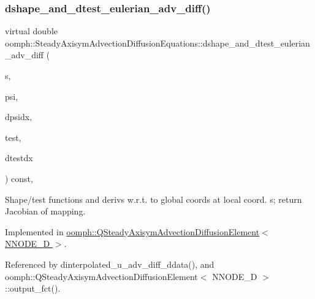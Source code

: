 \subsubsection{\texorpdfstring{dshape\+\_\+and\+\_\+dtest\+\_\+eulerian\+\_\+adv\+\_\+diff()}{dshape\_and\_dtest\_eulerian\_adv\_diff()}}
{\footnotesize\ttfamily virtual double oomph\+::\+Steady\+Axisym\+Advection\+Diffusion\+Equations\+::dshape\+\_\+and\+\_\+dtest\+\_\+eulerian\+\_\+adv\+\_\+diff (\begin{DoxyParamCaption}\item[{const \hyperlink{classoomph_1_1Vector}{Vector}$<$ double $>$ \&}]{s,  }\item[{\hyperlink{classoomph_1_1Shape}{Shape} \&}]{psi,  }\item[{\hyperlink{classoomph_1_1DShape}{D\+Shape} \&}]{dpsidx,  }\item[{\hyperlink{classoomph_1_1Shape}{Shape} \&}]{test,  }\item[{\hyperlink{classoomph_1_1DShape}{D\+Shape} \&}]{dtestdx }\end{DoxyParamCaption}) const\hspace{0.3cm}{\ttfamily [protected]}, {}}



Shape/test functions and derivs w.\+r.\+t. to global coords at local coord. s; return Jacobian of mapping. 



Implemented in \hyperlink{classoomph_1_1QSteadyAxisymAdvectionDiffusionElement_a489c77885741e624d87abe60a82483f3}{oomph\+::\+Q\+Steady\+Axisym\+Advection\+Diffusion\+Element$<$ N\+N\+O\+D\+E\+\_\+D $>$}.



Referenced by dinterpolated\+\_\+u\+\_\+adv\+\_\+diff\+\_\+ddata(), and oomph\+::\+Q\+Steady\+Axisym\+Advection\+Diffusion\+Element$<$ N\+N\+O\+D\+E\+\_\+D $>$\+::output\+\_\+fct().

\mbox{\label{classoomph_1_1SteadyAxisymAdvectionDiffusionEquations_a169cdaf88ac3dae29c77fba726346a0c}} 

